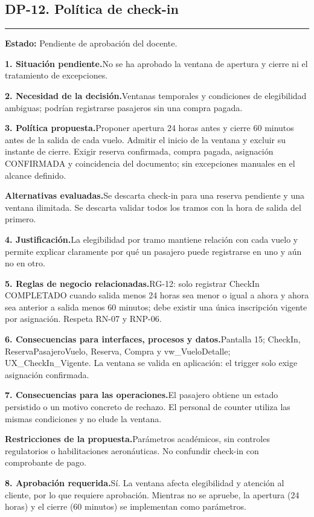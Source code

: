 \documentclass[11pt,a4paper]{article}
\newcommand{\fichacampo}[2]{\noindent\textbf{\color{azulvip}#1}\enspace #2\par\vspace{3pt}}
\begin{document}
\subsection{DP-12. Política de check-in}
{\color{doradovip}\rule{\textwidth}{.5pt}}
\textbf{Estado:} Pendiente de aprobación del docente.\par\vspace{4pt}
{\normalsize
\fichacampo{1. Situación pendiente.}{No se ha aprobado la ventana de apertura y cierre ni el tratamiento de excepciones.}
\fichacampo{2. Necesidad de la decisión.}{Ventanas temporales y condiciones de elegibilidad ambiguas; podrían registrarse pasajeros sin una compra pagada.}
\fichacampo{3. Política propuesta.}{Proponer apertura 24 horas antes y cierre 60 minutos antes de la salida de cada vuelo. Admitir el inicio de la ventana y excluir su instante de cierre. Exigir reserva confirmada, compra pagada, asignación CONFIRMADA y coincidencia del documento; sin excepciones manuales en el alcance definido.}
\fichacampo{Alternativas evaluadas.}{Se descarta check-in para una reserva pendiente y una ventana ilimitada. Se descarta validar todos los tramos con la hora de salida del primero.}
\fichacampo{4. Justificación.}{La elegibilidad por tramo mantiene relación con cada vuelo y permite explicar claramente por qué un pasajero puede registrarse en uno y aún no en otro.}
\fichacampo{5. Reglas de negocio relacionadas.}{RG-12: solo registrar CheckIn COMPLETADO cuando salida menos 24 horas sea menor o igual a ahora y ahora sea anterior a salida menos 60 minutos; debe existir una única inscripción vigente por asignación. Respeta RN-07 y RNP-06.}
\fichacampo{6. Consecuencias para interfaces, procesos y datos.}{Pantalla 15; CheckIn, ReservaPasajeroVuelo, Reserva, Compra y vw\_VueloDetalle; UX\_CheckIn\_Vigente. La ventana se valida en aplicación: el trigger solo exige asignación confirmada.}
\fichacampo{7. Consecuencias para las operaciones.}{El pasajero obtiene un estado persistido o un motivo concreto de rechazo. El personal de counter utiliza las mismas condiciones y no elude la ventana.}
\fichacampo{Restricciones de la propuesta.}{Parámetros académicos, sin controles regulatorios o habilitaciones aeronáuticas. No confundir check-in con comprobante de pago.}
\fichacampo{8. Aprobación requerida.}{Sí. La ventana afecta elegibilidad y atención al cliente, por lo que requiere aprobación. Mientras no se apruebe, la apertura (24 horas) y el cierre (60 minutos) se implementan como parámetros.}
}
\clearpage
\end{document}
